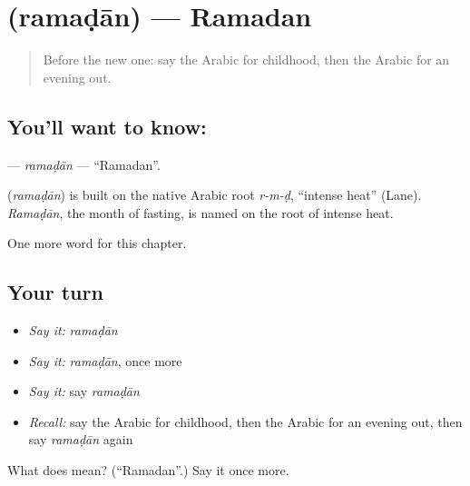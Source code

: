 \section[\texorpdfstring{\ar{رمضان} (ramaḍān)}{رمضان (ramaḍān)}]{ (ramaḍān) — Ramadan}

\label{lesson:AR-C264-ramadan}



\begin{quote}
Before the new one: say the Arabic for childhood, then the Arabic for an evening out.
\end{quote}

\subsection*{You'll want to know: }
\textbf{} — \emph{ramaḍān} — \textquotedblleft{}Ramadan\textquotedblright{}.

\begin{cousinweb}
\textbf{} (\emph{ramaḍān}) is built on the native Arabic root \emph{r-m-ḍ}, \textquotedblleft{}intense heat\textquotedblright{} (Lane). \emph{Ramaḍān}, the month of fasting, is named on the root of intense heat.
\end{cousinweb}

\begin{grammarlens}[title={What you've built}]
One more word for this chapter.
\end{grammarlens}

\subsection*{Your turn}
\begin{itemize}
\raggedright
  \item \emph{Say it:} \emph{ramaḍān}
  \item \emph{Say it:} \emph{ramaḍān}, once more
  \item \emph{Say it:} say \emph{ramaḍān}
  \item \emph{Recall:} say the Arabic for childhood, then the Arabic for an evening out, then say \emph{ramaḍān} again
\end{itemize}

\begin{tcolorbox}[breakable,colback=teal!4,colframe=teal!35!black,title={Before you move on}]
What does  mean? (\textquotedblleft{}Ramadan\textquotedblright{}.) Say it once more.
\end{tcolorbox}
